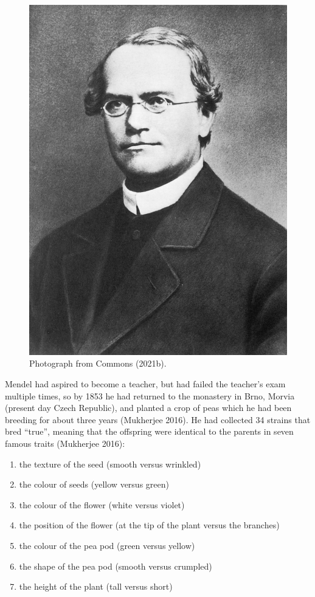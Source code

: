 \documentclass[
]{book}
\begin{document}
\begin{figure}

\hfill{}\includegraphics[width=1\linewidth]{figs/introduction/Gregor_Mendel_2} 

\caption{Photograph from Commons (2021b).}\label{fig:mendel}
\end{figure}

Mendel had aspired to become a teacher, but had failed the teacher's exam multiple times, so by 1853 he had returned to the monastery in Brno, Morvia (present day Czech Republic), and planted a crop of peas which he had been breeding for about three years (Mukherjee 2016). He had collected 34 strains that bred ``true'', meaning that the offspring were identical to the parents in seven famous traits (Mukherjee 2016):

\begin{enumerate}
\def\labelenumi{\arabic{enumi}.}
\item
  the texture of the seed (smooth versus wrinkled)
\item
  the colour of seeds (yellow versus green)
\item
  the colour of the flower (white versus violet)
\item
  the position of the flower (at the tip of the plant versus the branches)
\item
  the colour of the pea pod (green versus yellow)
\item
  the shape of the pea pod (smooth versus crumpled)
\item
  the height of the plant (tall versus short)
\end{enumerate}
\end{document}
